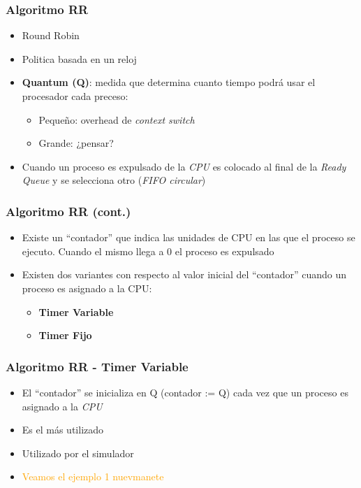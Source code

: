 \begin{frame}
  \frametitle{Algoritmo \textbf{RR}}
  \begin{itemize}
  		\item Round Robin
		\item Politica basada en un reloj
		\item \textbf{Quantum (Q)}: medida que determina cuanto tiempo podrá usar el procesador cada preceso:
		\begin{itemize}
			\item Pequeño: overhead de \textit{context switch}
			\item Grande: ¿pensar?
		\end{itemize}
		\item Cuando un proceso es expulsado de la \textit{CPU} es colocado al final de la \textit{Ready Queue} y se selecciona otro (\textit{FIFO circular})
  \end{itemize}
\end{frame}

\begin{frame}
  \frametitle{Algoritmo \textbf{RR} (cont.)}
  \begin{itemize}
  		\item Existe un ``contador'' que indica las unidades de CPU en las que el proceso se ejecuto. Cuando el mismo llega a 0 el proceso es expulsado
		\item Existen dos variantes con respecto al valor inicial del ``contador'' cuando un proceso es asignado a la CPU:
		\begin{itemize}
			\item \textbf{Timer Variable}
			\item \textbf{Timer Fijo}
		\end{itemize}
  \end{itemize}
\end{frame}

\begin{frame}
  \frametitle{Algoritmo \textbf{RR - Timer Variable}}
  \begin{itemize}
  		\item El ``contador'' se inicializa en Q (contador := Q) cada vez que un proceso es asignado a la \emph{CPU}
		\item Es el más utilizado
		\item Utilizado por el simulador
		\pause
		\item \textcolor{orange}{Veamos el ejemplo 1 nuevmanete}
  \end{itemize}
\end{frame}

